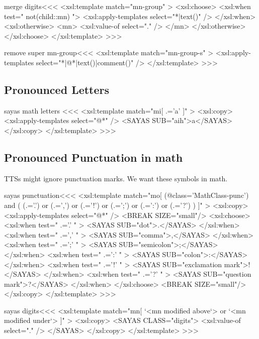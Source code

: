 \documentclass{article}
\begin{document}
\<merge digits\><<<
<xsl:template match="mn-group" >
   <xsl:choose>
      <xsl:when test=" not(child::mn) ">
        <xsl:apply-templates select="*|text()" />
      </xsl:when>
      <xsl:otherwise>
         <mn>
           <xsl:value-of select="." />
         </mn>
      </xsl:otherwise>
   </xsl:choose>
</xsl:template> 
>>>








\<remove super mn-group\><<<
<xsl:template match="mn-group-s" >
  <xsl:apply-templates select="*|@*|text()|comment()" />
</xsl:template> 
>>>



\subsection{Pronounced Letters}



\<sayas math letters \><<<
<xsl:template match="mi[ .='a' ]" >
  <xsl:copy>
    <xsl:apply-templates select="@*" />
    <SAYAS SUB="aih">a</SAYAS>   
  </xsl:copy>
</xsl:template> 
>>>


\subsection{Pronounced Punctuation in math}

TTSs might ignore punctuation marks. We want these
symbols in math.

\<sayas punctuation\><<<
<xsl:template match="mo[ 
    (@class='MathClass-punc')
    and ( (.='.') or (.=',')  or (.='!') 
          or (.=';') or (.=':') or (.='?') )
]" >
  <xsl:copy>
    <xsl:apply-templates select="@*" />
    <BREAK SIZE="small"/>
    <xsl:choose>
       <xsl:when test=" .='.' " >
          <SAYAS SUB="dot">.</SAYAS>
       </xsl:when>
       <xsl:when test=" .=',' " >
          <SAYAS SUB="comma">,</SAYAS>
       </xsl:when>
       <xsl:when test=" .=';' " >
          <SAYAS SUB="semicolon">;</SAYAS>
       </xsl:when>
       <xsl:when test=" .=':' " >
          <SAYAS SUB="colon">:</SAYAS>
       </xsl:when>
       <xsl:when test=" .='!' " >
          <SAYAS SUB="exclamation mark">!</SAYAS>
       </xsl:when>
       <xsl:when test=" .='?' " >
          <SAYAS SUB="question mark">?</SAYAS>
       </xsl:when>
    </xsl:choose>
    <BREAK SIZE="small"/>
  </xsl:copy>
</xsl:template> 
>>>


\<sayas digits\><<<
<xsl:template match="mn[
   `<mn modified above`>
   or
   `<mn modified under`>
]" >
  <xsl:copy>
    <SAYAS CLASS="digits">
      <xsl:value-of select="." />
    </SAYAS>
  </xsl:copy>
</xsl:template> 
>>>
\end{document}
